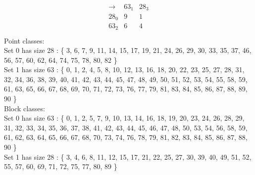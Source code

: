 \begin{align*}
\begin{array}{r|*{2}{r}}
\rightarrow  &     63_{  1} &     28_{  3}\\
\hline
    28_{  0} &            9 &            1\\
    63_{  2} &            6 &            4\\
\end{array}
\end{align*}
Point classes:\\
Set 0 has size 28 : \{ 3, 6, 7, 9, 11, 14, 15, 17, 19, 21, 24, 26, 29, 30, 33, 35, 37, 46, 56, 57, 60, 62, 64, 74, 75, 78, 80, 82 \}\\
Set 1 has size 63 : \{ 0, 1, 2, 4, 5, 8, 10, 12, 13, 16, 18, 20, 22, 23, 25, 27, 28, 31, 32, 34, 36, 38, 39, 40, 41, 42, 43, 44, 45, 47, 48, 49, 50, 51, 52, 53, 54, 55, 58, 59, 61, 63, 65, 66, 67, 68, 69, 70, 71, 72, 73, 76, 77, 79, 81, 83, 84, 85, 86, 87, 88, 89, 90 \}\\
Block classes:\\
Set 0 has size 63 : \{ 0, 1, 2, 5, 7, 9, 10, 13, 14, 16, 18, 19, 20, 23, 24, 26, 28, 29, 31, 32, 33, 34, 35, 36, 37, 38, 41, 42, 43, 44, 45, 46, 47, 48, 50, 53, 54, 56, 58, 59, 61, 62, 63, 64, 65, 66, 67, 68, 70, 73, 74, 76, 78, 79, 81, 82, 83, 84, 85, 86, 87, 88, 90 \}\\
Set 1 has size 28 : \{ 3, 4, 6, 8, 11, 12, 15, 17, 21, 22, 25, 27, 30, 39, 40, 49, 51, 52, 55, 57, 60, 69, 71, 72, 75, 77, 80, 89 \}\\

